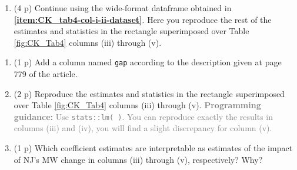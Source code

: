 \documentclass[
]{article}
\providecommand{\tightlist}{%
  \setlength{\itemsep}{0pt}\setlength{\parskip}{0pt}}
\begin{document}
\begin{enumerate}
\def\labelenumi{\arabic{enumi}.}
\setcounter{enumi}{18}
\tightlist
\item
  (4 p) Continue using the wide-format dataframe obtained in
  \textbf{\ref{item:CK_tab4-col-i-ii-dataset}}. Here you reproduce the
  rest of the estimates and statistics in the rectangle superimposed
  over Table \ref{fig:CK_Tab4} columns (iii) through (v).
\end{enumerate}

\begin{enumerate}
\def\labelenumi{\alph{enumi}.}
\item
  (1 p) Add a column named \texttt{gap} according to the description
  given at page 779 of the article.
\item
  (2 p) Reproduce the estimates and statistics in the rectangle
  superimposed over Table \ref{fig:CK_Tab4} columns (iii) through (v).
  \textcolor{gray}{\textbf{Programming guidance:} Use \texttt{stats::lm( )}. You can reproduce exactly the results in columns (iii) and (iv), you will find a slight discrepancy for column (v).}
\item
  (1 p) Which coefficient estimates are interpretable as estimates of
  the impact of NJ's MW change in columns (iii) through (v),
  respectively? Why?
\end{enumerate}
\end{document}
